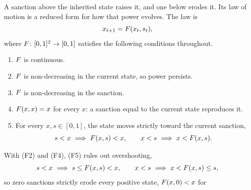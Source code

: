  A sanction above the inherited
state raises it, and one below erodes it. Its law of motion is a reduced form
for how that power evolves. The law is
\begin{equation}
x_{t+1}=F(x_t,s_t),
\label{eq:transition}
\end{equation}
where $F\colon[0,1]^2\to[0,1]$ satisfies the following conditions throughout.
\begin{enumerate}[label=\textup{(F\arabic*)}]
\item $F$ is continuous.
\item $F$ is non-decreasing in the current state, so power persists.
\item $F$ is non-decreasing in the sanction.
\item $F(x,x)=x$ for every $x$: a sanction equal to the current state reproduces it.
\item For every $x,s\in[0,1]$, the state moves strictly toward the current sanction,
\[
s<x\ \Longrightarrow\ F(x,s)<x,
\qquad
x<s\ \Longrightarrow\ x<F(x,s).
\]
\end{enumerate}
With \textup{(F2)} and \textup{(F4)}, \textup{(F5)} rules out overshooting,
\[
s<x\ \Longrightarrow\ s\leq\F(x,s)<x,
\qquad
x<s\ \Longrightarrow\ x<\F(x,s)\leq s,
\]
so zero sanctions strictly erode every positive state, $F(x,0)<x$ for
